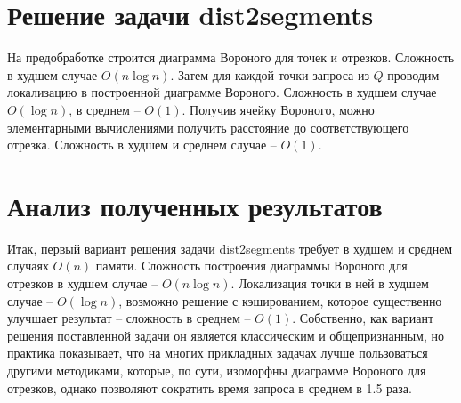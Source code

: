 \section{Решение задачи dist2segments}

На предобработке строится диаграмма Вороного для точек и отрезков.
Сложность в худшем случае $O(n \log n)$. Затем для каждой точки-запроса из $Q$
проводим локализацию в построенной диаграмме Вороного. Сложность в
худшем случае $O(\log n)$, в среднем -- $O(1)$. Получив ячейку Вороного, можно
элементарными вычислениями получить расстояние до соответствующего
отрезка. Сложность в худшем и среднем случае -- $O(1)$.

\section{Анализ полученных результатов}

Итак, первый вариант решения задачи dist2segments требует в худшем и
среднем случаях $O(n)$ памяти. Сложность построения диаграммы Вороного для отрезков
 в худшем случае -- $O(n \log n)$. Локализация точки в ней в худшем случае -- $O(\log n)$, 
возможно решение с кэшированием, которое существенно улучшает результат --
сложность в среднем -- $O(1)$. Собственно, как вариант решения поставленной
задачи он является классическим и общепризнанным, но практика показывает,
что на многих прикладных задачах лучше пользоваться другими методиками,
которые, по сути, изоморфны диаграмме Вороного для отрезков, однако позволяют сократить время 
запроса в среднем в 1.5 раза.
